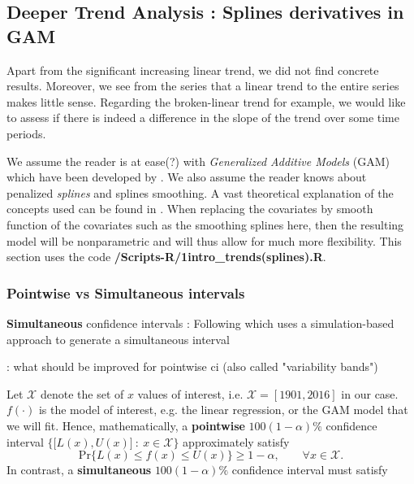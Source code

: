 \subsection{Deeper Trend Analysis : Splines derivatives in GAM}\label{sec:splines}

Apart from the significant increasing linear trend, we did not find concrete results. Moreover, we see from the series that a linear trend to the entire series makes little sense. Regarding the broken-linear trend for example, we would like to assess if there is indeed a difference in the slope of the trend over some time periods. 

We assume the reader is at ease(?) with\emph{ Generalized Additive Models} (GAM) which have been developed by \citet{hastie_generalized_1986}. We also assume the reader knows about penalized \emph{splines} and splines smoothing. A vast theoretical explanation of the concepts used can be found in \citet[chapter 3, 6 and 11]{ruppert_semiparametric_2003}. When replacing the covariates by smooth function of the covariates such as the smoothing splines here, then the resulting model will be nonparametric and will thus allow for much more flexibility.
 This section uses the code \textbf{/Scripts-R/1intro\_trends(splines).R}.


\subsubsection*{Pointwise vs Simultaneous intervals}

\textbf{Simultaneous} confidence intervals :  Following \citet[Section 4.9, 6.5]{ruppert_semiparametric_2003} which uses a simulation-based approach to generate a simultaneous interval
\citet{marra_coverage_2012}

\citet[p.135]{ruppert_semiparametric_2003} : what should be improved for pointwise ci (also called "variability bands")

Let $\mathcal{X}$ denote the set of $x$ values of interest, i.e. $\mathcal{X}=[1901,2016]$ in our case. $f(\cdot)$ is the model of interest, e.g. the linear regression, or the GAM model that we will fit. Hence, mathematically, a \textbf{pointwise} $100(1-\alpha)\%$ confidence interval $\Big\{\big[L(x),U(x)\big] \ : \ x\in \mathcal{X}\Big\}$ approximately satisfy 
\begin{equation}
\text{Pr}\Big\{L(x)\leq f(x)\leq U(x)\Big\}\geq 1-\alpha, \qquad \forall x\in\mathcal{X}.
\end{equation}
In contrast, a \textbf{simultaneous} $100(1-\alpha)\%$ confidence interval must satisfy 

